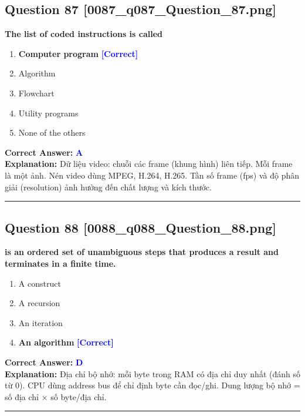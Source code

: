 \documentclass[11pt,a4paper]{article}
\begin{document}
\begin{minipage}{\textwidth}
\subsection*{Question 87 \quad \footnotesize{[0087\_q087\_Question\_87.png]}}
\noindent \textbf{The list of coded instructions is called}

\begin{enumerate}[label=\Alph*.]
    \item \textbf{Computer program} \hfill \textcolor{blue}{\textbf{[Correct]}}
    \item Algorithm
    \item Flowchart
    \item Utility programs
    \item None of the others
\end{enumerate}

\noindent \textbf{Correct Answer:} \textcolor{blue}{\textbf{A}} \\[2pt]
\noindent \textbf{Explanation:} Dữ liệu video: chuỗi các frame (khung hình) liên tiếp. Mỗi frame là một ảnh. Nén video dùng MPEG, H.264, H.265. Tần số frame (fps) và độ phân giải (resolution) ảnh hưởng đến chất lượng và kích thước.

\par\vspace{0.3cm}
\hrule
\vspace{0.3cm}
\end{minipage}

\begin{minipage}{\textwidth}
\subsection*{Question 88 \quad \footnotesize{[0088\_q088\_Question\_88.png]}}
\noindent \textbf{is an ordered set of unambiguous steps that produces a result and terminates in a finite time.}

\begin{enumerate}[label=\Alph*.]
    \item A construct
    \item A recursion
    \item An iteration
    \item \textbf{An algorithm} \hfill \textcolor{blue}{\textbf{[Correct]}}
\end{enumerate}

\noindent \textbf{Correct Answer:} \textcolor{blue}{\textbf{D}} \\[2pt]
\noindent \textbf{Explanation:} Địa chỉ bộ nhớ: mỗi byte trong RAM có địa chỉ duy nhất (đánh số từ 0). CPU dùng address bus để chỉ định byte cần đọc/ghi. Dung lượng bộ nhớ = số địa chỉ × số byte/địa chỉ.

\par\vspace{0.3cm}
\hrule
\vspace{0.3cm}
\end{minipage}
\end{document}

